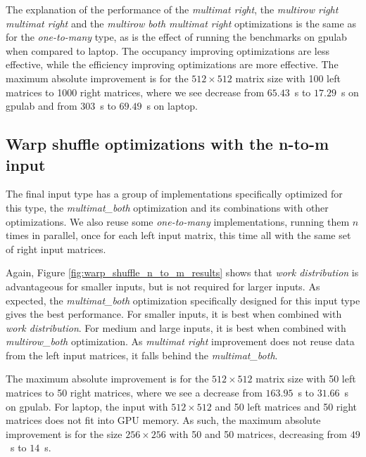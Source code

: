 The explanation of the performance of the \textit{multimat right}, the \textit{multirow right multimat right} and the \textit{multirow both multimat right} optimizations is the same as for the \textit{one-to-many} type, as is the effect of running the benchmarks on gpulab when compared to laptop. The occupancy improving optimizations are less effective, while the efficiency improving optimizations are more effective. 
The maximum absolute improvement is for the $512 \times 512$ matrix size with 100 left matrices to 1000 right matrices, where we see decrease from $65.43$~s to $17.29$~s on gpulab and from $303$~s to $69.49$~s on laptop.


\subsection{Warp shuffle optimizations with the n-to-m input}
The final input type has a group of implementations specifically optimized for this type, the \textit{multimat\_both} optimization and its combinations with other optimizations. We also reuse some \textit{one-to-many} implementations, running them $n$ times in parallel, once for each left input matrix, this time all with the same set of right input matrices.

Again, Figure \ref{fig:warp_shuffle_n_to_m_results} shows that \textit{work distribution} is advantageous for smaller inputs, but is not required for larger inputs. As expected, the \textit{multimat\_both} optimization specifically designed for this input type gives the best performance. For smaller inputs, it is best when combined with \textit{work distribution}. For medium and large inputs, it is best when combined with \textit{multirow\_both} optimization. As \textit{multimat right} improvement does not reuse data from the left input matrices, it falls behind the \textit{multimat\_both}.

The maximum absolute improvement is for the $512 \times 512$ matrix size with 50 left matrices to 50 right matrices, where we see a decrease from $163.95$~s to $31.66$~s on gpulab. For laptop, the input with $512 \times 512$ and 50 left matrices and 50 right matrices does not fit into GPU memory. As such, the maximum absolute improvement is for the size $256 \times 256$ with 50 and 50 matrices, decreasing from $49$~s to $14$~s.

